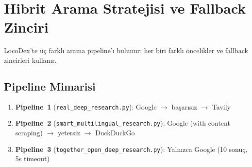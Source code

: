 \section{Hibrit Arama Stratejisi ve Fallback Zinciri}
\label{sec:hibrit-arama}

LocoDex'te \"{u}\c{c} farkl{\i} arama pipeline'{\i} bulunur; her biri farkl{\i} \"{o}ncelikler ve fallback zincirleri kullan{\i}r.

\subsection{Pipeline Mimarisi}

\begin{enumerate}
  \item \textbf{Pipeline~1} (\texttt{real\_deep\_research.py}): Google $\to$ ba\c{s}ar{\i}s{\i}z $\to$ Tavily
  \item \textbf{Pipeline~2} (\texttt{smart\_multilingual\_research.py}): Google (with content scraping) $\to$ yetersiz $\to$ DuckDuckGo
  \item \textbf{Pipeline~3} (\texttt{together\_open\_deep\_research.py}): Yaln{\i}zca Google (10 sonu\c{c}, 5s timeout)
\end{enumerate}


